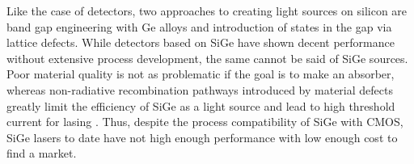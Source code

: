 Like the case of detectors, two approaches to creating light sources on silicon are band gap engineering with Ge alloys and introduction of states in the gap via lattice defects. While detectors based on SiGe have shown decent performance without extensive process development, the same cannot be said of SiGe sources. Poor material quality is not as problematic if the goal is to make an absorber, whereas non-radiative recombination pathways introduced by material defects greatly limit the efficiency of SiGe as a light source and lead to high threshold current for lasing \cite{zhyi2015}. Thus, despite the process compatibility of SiGe with CMOS, SiGe lasers to date have not high enough performance with low enough cost to find a market. 

